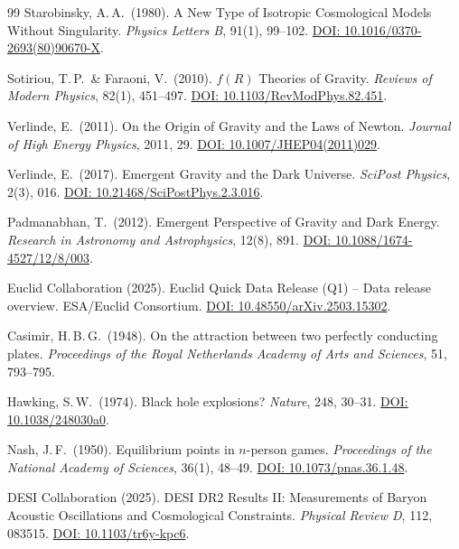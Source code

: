 \documentclass[aps,prd,twocolumn,superscriptaddress,nofootinbib]{revtex4-2}
\begin{document}
\begin{thebibliography}{99}
Starobinsky, A.\,A.\ (1980).
A New Type of Isotropic Cosmological Models Without Singularity.
\textit{Physics Letters B}, 91(1), 99--102.
\href{https://doi.org/10.1016/0370-2693(80)90670-X}{DOI: 10.1016/0370-2693(80)90670-X}.

Sotiriou, T.\,P.\ \& Faraoni, V.\ (2010).
$f(R)$ Theories of Gravity.
\textit{Reviews of Modern Physics}, 82(1), 451--497.
\href{https://doi.org/10.1103/RevModPhys.82.451}{DOI: 10.1103/RevModPhys.82.451}.

Verlinde, E.\ (2011).
On the Origin of Gravity and the Laws of Newton.
\textit{Journal of High Energy Physics}, 2011, 29.
\href{https://doi.org/10.1007/JHEP04(2011)029}{DOI: 10.1007/JHEP04(2011)029}.

Verlinde, E.\ (2017).
Emergent Gravity and the Dark Universe.
\textit{SciPost Physics}, 2(3), 016.
\href{https://doi.org/10.21468/SciPostPhys.2.3.016}{DOI: 10.21468/SciPostPhys.2.3.016}.

Padmanabhan, T.\ (2012).
Emergent Perspective of Gravity and Dark Energy.
\textit{Research in Astronomy and Astrophysics}, 12(8), 891.
\href{https://doi.org/10.1088/1674-4527/12/8/003}{DOI: 10.1088/1674-4527/12/8/003}.

Euclid Collaboration (2025).
Euclid Quick Data Release (Q1) -- Data release overview.
ESA/Euclid Consortium.
\href{https://doi.org/10.48550/arXiv.2503.15302}{DOI: 10.48550/arXiv.2503.15302}.

Casimir, H.\,B.\,G.\ (1948).
On the attraction between two perfectly conducting plates.
\textit{Proceedings of the Royal Netherlands Academy of Arts and Sciences}, 51, 793--795.

Hawking, S.\,W.\ (1974).
Black hole explosions?
\textit{Nature}, 248, 30--31.
\href{https://doi.org/10.1038/248030a0}{DOI: 10.1038/248030a0}.

Nash, J.\,F.\ (1950).
Equilibrium points in $n$-person games.
\textit{Proceedings of the National Academy of Sciences}, 36(1), 48--49.
\href{https://doi.org/10.1073/pnas.36.1.48}{DOI: 10.1073/pnas.36.1.48}.

DESI Collaboration (2025).
DESI DR2 Results II: Measurements of Baryon Acoustic Oscillations and Cosmological Constraints.
\textit{Physical Review D}, 112, 083515.
\href{https://doi.org/10.1103/tr6y-kpc6}{DOI: 10.1103/tr6y-kpc6}.


\end{thebibliography}
\end{document}
